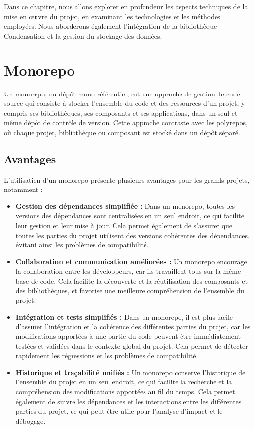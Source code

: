 Dans ce chapitre, nous allons explorer en profondeur les aspects techniques de la mise en œuvre du projet, en examinant les technologies et les méthodes employées. Nous aborderons également l'intégration de la bibliothèque Condensation et la gestion du stockage des données.

\section{Monorepo}
Un monorepo, ou dépôt mono-référentiel, est une approche de gestion de code source qui consiste à stocker l'ensemble du code et des ressources d'un projet, y compris ses bibliothèques, ses composants et ses applications, dans un seul et même dépôt de contrôle de version. Cette approche contraste avec les polyrepos, où chaque projet, bibliothèque ou composant est stocké dans un dépôt séparé.

\subsection{Avantages}

L'utilisation d'un monorepo présente plusieurs avantages pour les grands projets, notamment :

\begin{itemize}
    \item \textbf{Gestion des dépendances simplifiée :} Dans un monorepo, toutes les versions des dépendances sont centralisées en un seul endroit, ce qui facilite leur gestion et leur mise à jour. Cela permet également de s'assurer que toutes les parties du projet utilisent des versions cohérentes des dépendances, évitant ainsi les problèmes de compatibilité.
    \item \textbf{Collaboration et communication améliorées :} Un monorepo encourage la collaboration entre les développeurs, car ils travaillent tous sur la même base de code. Cela facilite la découverte et la réutilisation des composants et des bibliothèques, et favorise une meilleure compréhension de l'ensemble du projet.
    \item \textbf{Intégration et tests simplifiés :} Dans un monorepo, il est plus facile d'assurer l'intégration et la cohérence des différentes parties du projet, car les modifications apportées à une partie du code peuvent être immédiatement testées et validées dans le contexte global du projet. Cela permet de détecter rapidement les régressions et les problèmes de compatibilité.
    \item \textbf{Historique et traçabilité unifiés :} Un monorepo conserve l'historique de l'ensemble du projet en un seul endroit, ce qui facilite la recherche et la compréhension des modifications apportées au fil du temps. Cela permet également de suivre les dépendances et les interactions entre les différentes parties du projet, ce qui peut être utile pour l'analyse d'impact et le débogage.
\end{itemize}


